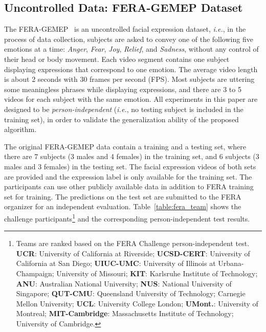 \documentclass[journal]{IEEEtran}
\begin{document}
\subsection{Uncontrolled Data: FERA-GEMEP Dataset}

The FERA-GEMEP~\cite{FERA_data} is an uncontrolled facial expression dataset, \textit{i.e.}, in the process of data collection, subjects are asked to convey one of the following five emotions at a time: \textit{Anger}, \textit{Fear}, \textit{Joy}, \textit{Relief}, and \textit{Sadness}, without any control of their head or body movement. Each video segment contains one subject displaying expressions that correspond to one emotion. The average video length is about 2 seconds with 30 frames per second (FPS). Most subjects are uttering some meaningless phrases while displaying expressions, and there are 3 to 5 videos for each subject with the same emotion. All experiments in this paper are designed to be \textit{person-independent} (\textit{i.e.}, no testing subject is included in the training set), in order to validate the generalization ability of the proposed algorithm. 

The original FERA-GEMEP data contain a training and a testing set, where there are 7 subjects (3 males and 4 females) in the training set, and 6 subjects (3 males and 3 females) in the testing set. The facial expression videos of both sets are provided and the expression label is only available for the training set. The participants can use other publicly available data in addition to FERA training set for training. The predictions on the test set are submitted to the FERA organizer for an independent evaluation. Table~\ref{table:fera_team} shows the challenge participants\footnote{\label{teams}Teams are ranked based on the FERA Challenge person-independent test. \textbf{UCR}: University of California at Riverside; \textbf{UCSD-CERT}: University of California at San Diego; \textbf{UIUC-UMC}: University of Illinois at Urbana-Champaign; University of Missouri; \textbf{KIT}: Karlsruhe Institute of Technology; \textbf{ANU}: Australian National University; \textbf{NUS}: National University of Singapore; \textbf{QUT-CMU}: Queensland University of Technology; Carnegie Mellon University; \textbf{UCL}: University College London; \textbf{UMont.}: University of Montreal;  \textbf{MIT-Cambridge}: Massachusetts Institute of Technology; University of Cambridge.} and the corresponding person-independent test results.
\end{document}
